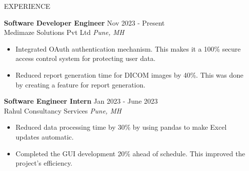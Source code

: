 \documentclass{resume} %
\begin{document}
\begin{rSection}{EXPERIENCE}

\textbf{Software Developer Engineer} \hfill Nov 2023 - Present\\
Medimaze Solutions Pvt Ltd \hfill \textit{Pune, MH}
 \begin{itemize}
    \itemsep -3pt {} 
    \item Integrated OAuth authentication mechanism. This makes it a 100\% secure access control system for protecting user data.
    \item Reduced report generation time for DICOM images by 40\%. This was done by creating a feature for report generation.
 \end{itemize}

 \textbf{Software Engineer Intern} \hfill Jan 2023 - June 2023\\
 Rahul Consultancy Services \hfill \textit{Pune, MH}
 \begin{itemize}
    \itemsep -3pt {} 
     \item Reduced data processing time by 30\%  by using pandas to make Excel updates automatic.
     \item Completed the GUI development 20\% ahead of schedule. This improved the project's efficiency.
 \end{itemize}
 

\end{rSection} 
\end{document}
